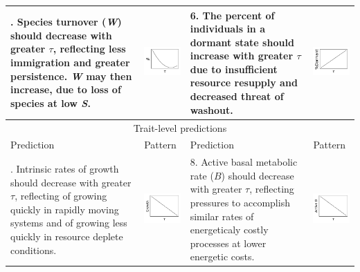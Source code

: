 \documentclass{article}
\begin{document}
\begin{table}
\begin{tabularx}{\textwidth}{m{5.6cm} m{3.4cm} m{5.6cm} m{3.4cm}}
\addlinespace
5. Species turnover (\textit{W}) should decrease with greater $\tau$, reflecting less immigration and greater persistence. \textit{W} may then increase, due to loss of species at low \textit{S}.
&
\begin{minipage}{.3\textwidth}
\includegraphics[width=30mm, height=25mm]{predictions/Beta}
\end{minipage}
&
6. The percent of individuals in a dormant state should increase with greater $\tau$ due to insufficient resource resupply and decreased threat of washout.
&
\begin{minipage}{.3\textwidth}
\includegraphics[width=30mm, height=25mm]{predictions/D}
\end{minipage} \\
 
\hline
\toprule
\multicolumn{4}{c}{Trait-level predictions} \\ 
\midrule
\hline
\toprule
Prediction & Pattern & Prediction & Pattern\\ [0.5ex]
\midrule

\addlinespace
7. Intrinsic rates of growth should decrease with greater $\tau$, reflecting of growing quickly in rapidly moving systems and of growing less quickly in resource deplete conditions.
&
\begin{minipage}{.3\textwidth}
\includegraphics[width=30mm, height=25mm]{predictions/Growth}
\end{minipage}
&
8. Active basal metabolic rate ($B$) should decrease with greater $\tau$, reflecting pressures to accomplish similar rates of energeticaly costly processes at lower energetic costs.
&
\begin{minipage}{.3\textwidth}
\includegraphics[width=30mm, height=25mm]{predictions/BMR}
\end{minipage} \\
 

\end{tabularx}
\end{table}
\end{document}
